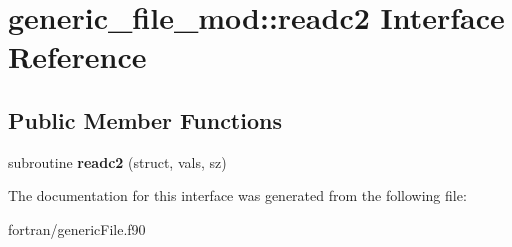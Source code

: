 \hypertarget{interfacegeneric__file__mod_1_1readc2}{}\section{generic\+\_\+file\+\_\+mod\+:\+:readc2 Interface Reference}
\label{interfacegeneric__file__mod_1_1readc2}
\subsection*{Public Member Functions}
\begin{DoxyCompactItemize}
\item 
\mbox{\label{interfacegeneric__file__mod_1_1readc2_a1a2d7f8285d34030ab541e07e3a32390}} 
subroutine {\bfseries readc2} (struct, vals, sz)
\end{DoxyCompactItemize}


The documentation for this interface was generated from the following file\+:\begin{DoxyCompactItemize}
\item 
fortran/generic\+File.\+f90\end{DoxyCompactItemize}
